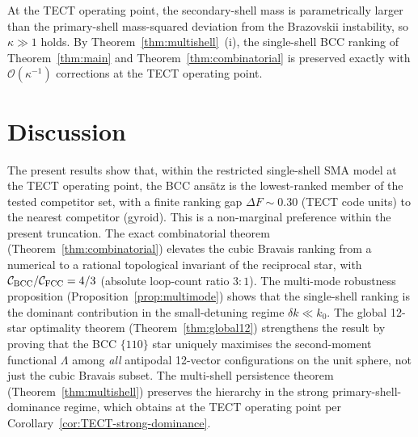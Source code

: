 \begin{corollary}
\label{cor:TECT-strong-dominance}
At the TECT operating point, the secondary-shell mass is
parametrically larger than the primary-shell mass-squared deviation
from the Brazovskii instability, so $\kappa \gg 1$ holds. By
Theorem~\ref{thm:multishell}~(i), the single-shell BCC ranking of
Theorem~\ref{thm:main} and Theorem~\ref{thm:combinatorial} is
preserved exactly with $\mathcal{O}(\kappa^{-1})$ corrections at the
TECT operating point.
\end{corollary}

\section{Discussion}\label{sec:discussion}

The present results show that, within the restricted single-shell
SMA model at the TECT operating point, the BCC ans\"atz is the
lowest-ranked member of the tested competitor set, with a finite
ranking gap $\Delta F \sim 0.30$ (TECT code units) to the nearest
competitor (gyroid). This is a non-marginal preference within the
present truncation. The exact combinatorial theorem
(Theorem~\ref{thm:combinatorial}) elevates the cubic Bravais ranking
from a numerical to a rational topological invariant of the reciprocal
star, with $\mathcal{C}_{\rm BCC}/\mathcal{C}_{\rm FCC} = 4/3$
(absolute loop-count ratio $3:1$). The multi-mode robustness
proposition (Proposition~\ref{prop:multimode}) shows that the
single-shell ranking is the dominant contribution in the small-detuning
regime $\delta k \ll k_0$. The global 12-star optimality theorem
(Theorem~\ref{thm:global12}) strengthens the result by proving that
the BCC $\{110\}$ star uniquely maximises the second-moment functional
$\Lambda$ among \emph{all} antipodal 12-vector configurations on the
unit sphere, not just the cubic Bravais subset. The multi-shell
persistence theorem (Theorem~\ref{thm:multishell}) preserves the
hierarchy in the strong primary-shell-dominance regime, which obtains
at the TECT operating point per
Corollary~\ref{cor:TECT-strong-dominance}.

